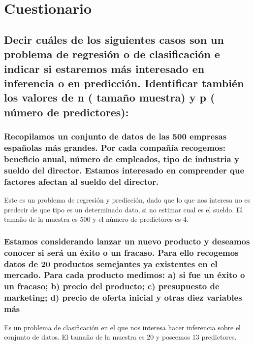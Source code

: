 \newpage %

\tableofcontents %

\listoffigures


\newpage




\section{Cuestionario}

\subsection{Decir cuáles de los siguientes casos son un problema de regresión o de clasificación e indicar si estaremos más interesado en inferencia o en predicción. Identificar también los valores de n ( tamaño muestra) y p ( número de predictores):}


\subsubsection{Recopilamos un conjunto de datos de las 500 empresas españolas más grandes. Por cada compañía recogemos: beneficio anual, número de empleados, tipo de industria y sueldo del director. Estamos interesado en comprender que factores afectan al sueldo del director.}

Este es un problema de regresión y predicción, dado que lo que nos interesa no es predecir de que tipo es un determinado dato, si no estimar cual es el sueldo. El tamaño de la muestra es 500 y el número de predictores es 4.


\subsubsection{Estamos considerando lanzar un nuevo producto y deseamos conocer si será un éxito o un fracaso. Para ello recogemos datos de 20 productos semejantes ya existentes en el mercado. Para cada producto medimos: a) si fue un éxito o un fracaso; b) precio del producto; c) presupuesto de marketing; d) precio de oferta inicial y otras diez variables más}
Es un problema de clasificación en el que nos interesa hacer inferencia sobre el conjunto de datos. El tamaño de la muestra es 20 y poseemos 13 predictores. 

